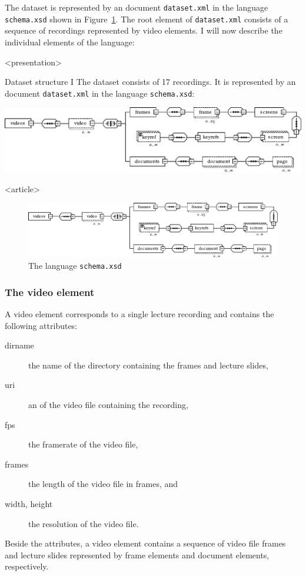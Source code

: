 The dataset is represented by an  document \texttt{dataset.xml} in
the language \texttt{schema.xsd} shown in Figure~\ref{fig:schema}. The root
element of \texttt{dataset.xml} consists of a sequence of recordings
represented by video elements. I will now describe the individual elements of
the language:

\mode
<presentation>

\begin{frame}{Dataset structure I}
The dataset consists of 17 recordings. It is represented by an 
document \texttt{dataset.xml} in the language \texttt{schema.xsd}:
\begin{center}
  \includegraphics[width=\textwidth]{fig/structure/schema}
\end{center}
\end{frame}

\mode
<article>

\begin{figure}
  \leavevmode{}\textwidth
  \includegraphics[width=1.4\textwidth]{fig/structure/schema}
  \caption{The  language \texttt{schema.xsd} }
  \label{fig:schema}
\end{figure}

\subsubsection*{The video element}
A video element corresponds to a single lecture recording and contains the
following attributes:
\begin{description}
  \item[dirname] the name of the directory containing the frames and lecture slides,
  \item[uri] an  of the video file containing the recording,
  \item[fps] the framerate of the video file,
  \item[frames] the length of the video file in frames, and
  \item[width\textmd, height] the resolution of the video file.
\end{description}
Beside the attributes, a video element contains a sequence of video file frames
and lecture slides represented by frame elements and document elements,
respectively.

